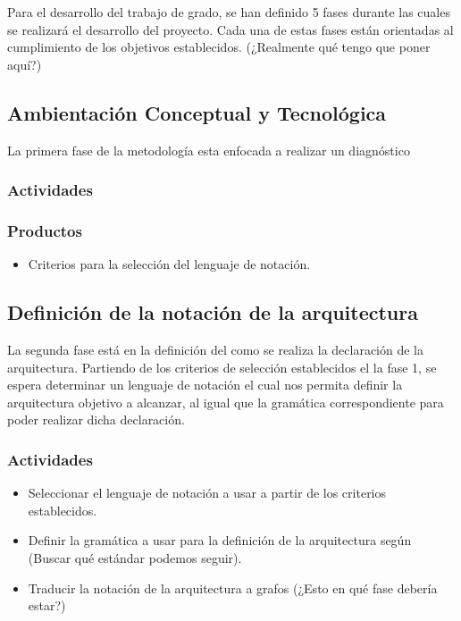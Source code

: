 \documentclass[12pt]{article}
\begin{document}
    Para el desarrollo del trabajo de grado, se han definido 5 fases durante las cuales se realizará el desarrollo del proyecto. Cada una de estas fases están orientadas al cumplimiento de los objetivos establecidos. (¿Realmente qué tengo que poner aquí?)

    \subsection{Ambientación Conceptual y Tecnológica}

    La primera fase de la metodología esta enfocada a realizar un diagnóstico 

    \subsubsection{Actividades}

    \subsubsection{Productos}

    \begin{itemize}
        \item Criterios para la selección del lenguaje de notación.
    \end{itemize}

    \subsection{Definición de la notación de la arquitectura}
    
    La segunda fase está en la definición del como se realiza la declaración de la arquitectura. Partiendo de los criterios de selección establecidos el la fase 1, se espera determinar un lenguaje de notación el cual nos permita definir la arquitectura objetivo a alcanzar, al igual que la gramática correspondiente para poder realizar dicha declaración. 
    
    \subsubsection{Actividades}

    \begin{itemize}
        \item Seleccionar el lenguaje de notación a usar a partir de los criterios establecidos.
        \item Definir la gramática a usar para la definición de la arquitectura según (Buscar qué estándar podemos seguir). %
        \item Traducir la notación de la arquitectura a grafos (¿Esto en qué fase debería estar?)
    \end{itemize}    
\end{document}
